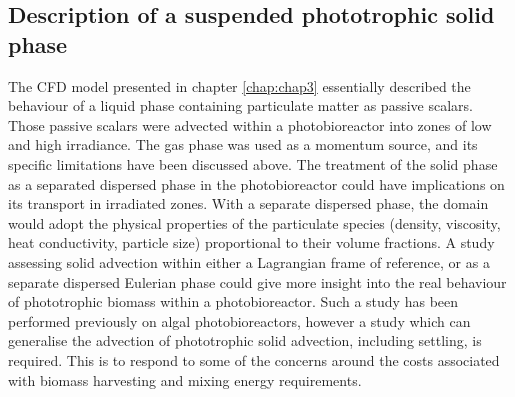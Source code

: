\subsection{Description of a suspended phototrophic solid phase}
The CFD model presented in chapter \ref{chap:chap3} essentially described the behaviour of a liquid phase containing particulate matter as passive scalars. Those passive scalars were advected within a photobioreactor into zones of low and high irradiance. The gas phase was used as a momentum source, and its specific limitations have been discussed above. The treatment of the solid phase as a separated dispersed phase in the photobioreactor could have implications on its transport in irradiated zones. With a separate dispersed phase, the domain would adopt the physical properties of the particulate species (density, viscosity, heat conductivity, particle size) proportional to their volume fractions. A study assessing solid advection within either a Lagrangian frame of reference, or as a separate dispersed Eulerian phase could give more insight into the real behaviour of phototrophic biomass within a photobioreactor. Such a study has been performed previously \cite{gao2016} on algal photobioreactors, however a study which can generalise the advection of phototrophic solid advection, including settling, is required. This is to respond to some of the concerns around the costs associated with biomass harvesting and mixing energy requirements. 


